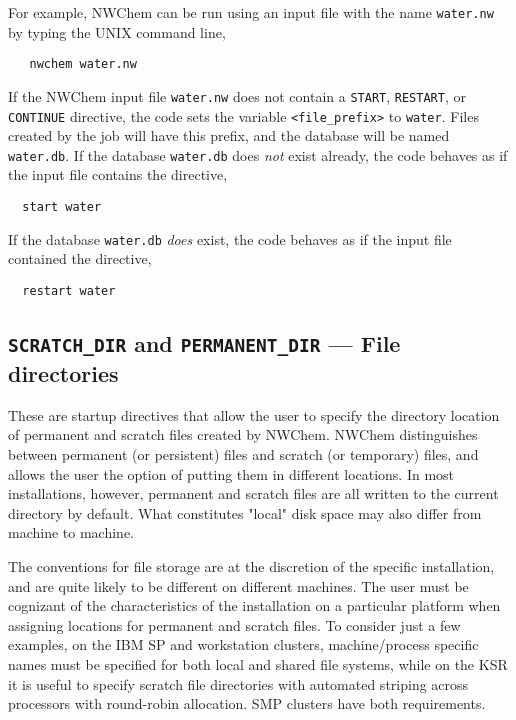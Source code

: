For example, NWChem can be run using an input file with the name 
\verb+water.nw+ 
by typing the UNIX command line,

\begin{verbatim}
   nwchem water.nw
\end{verbatim}

If the NWChem input file \verb+water.nw+ does not contain
a \verb+START+, \verb+RESTART+, or \verb+CONTINUE+ directive, the code
sets the variable {\tt <file\_prefix>} to {\tt water}.  Files created
by the job will have this prefix, and the database will be named
{\tt water.db}.  If the database \verb+water.db+ does {\it not} exist already,
the code behaves as if the input file contains the directive,

\begin{verbatim}
  start water
\end{verbatim}

If the database \verb+water.db+ {\it does} exist,
the code behaves as if the input file contained the directive,

\begin{verbatim}
  restart water
\end{verbatim}


\subsection{{\tt SCRATCH\_DIR} and {\tt PERMANENT\_DIR} --- File directories}
\label{sec:dirs}


These are startup directives that allow the user to specify the
directory location of permanent and scratch files created by NWChem.
NWChem distinguishes between permanent (or persistent) files and
scratch (or temporary) files, and allows the user the option of
putting them in different locations.  In most installations, however,
permanent and scratch files are all written to the current directory
by default.  What constitutes "local" disk space may also differ from 
machine to machine.

The conventions for file storage are at the discretion of the specific 
installation, and are quite likely to be different on different machines.  
The user must be cognizant of the characteristics of the installation
on a particular platform when assigning locations for permanent and
scratch files.  To consider just a few examples, on the IBM SP 
and workstation clusters, machine/process
specific names must be specified for both local and shared file
systems, while on the KSR it is useful to specify scratch file directories
with automated striping across processors with round-robin allocation.
SMP clusters have both requirements.  


